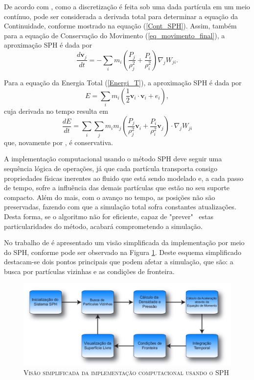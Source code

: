 De acordo com , como a discretização é feita sob uma dada partícula em um meio contínuo, pode ser considerada a derivada total para determinar a equação da Continuidade, conforme mostrado na equação (\ref{Cont_SPH}). Assim, também para a equação de Conservação do Movimento (\ref{eq_movimento_final}), a aproximação SPH é dada por
\begin{equation} \label{Mov_SPH}
\frac{d \textbf{v}_j}{dt} = -\sum\limits_{i}m_{i} \left( \frac{P_j}{\rho^{2}_{j}} + \frac{P_i}{\rho^{2}_{i}} \right) \nabla_{j}W_{ji}.
\end{equation}

Para a equação da Energia Total (\ref{Energi_T}),  a aproximação SPH é dada por
\begin{equation} \label{energ_SPH}
E = \sum\limits_{i} m_{i} \left( \frac{1}{2} \textbf{v}_{i} \cdot \textbf{v}_{i} + e_{i} \right),
\end{equation}
cuja derivada no tempo resulta em
\begin{equation}
\frac{dE}{dt} = \sum\limits_{i} \sum\limits_{j}  m_{i}  m_{j} \left( \frac{P_j}{\rho^{2}_{j}} \textbf{v}_{i} +  \frac{P_i}{\rho^{2}_{i}} \textbf{v}_{j} \right) \cdot \nabla_{j}W_{ji} 
\end{equation}
que, novamente por , é conservativa.

A implementação computacional usando o método SPH deve seguir uma sequência lógica de operações, já que cada partícula transporta consigo propriedades físicas inerentes ao fluido que está sendo modelado e, a cada passo de tempo, sofre a influência das demais partículas que estão no seu suporte compacto. Além do mais, com o avanço no tempo, as posições não são preservadas, fazendo com que a simulação total sofra constantes atualizações. Desta forma, se o algoritmo não for eficiente, capaz de "prever" \ estas particularidades do método, acabará comprometendo a simulação.

No trabalho de  é apresentado um visão simplificada da implementação por meio do SPH, conforme pode ser observado na Figura \ref{fig:visao}. Deste esquema simplificado destacam-se dois pontos principais que podem afetar a simulação, que são: a busca por partículas vizinhas e as condições de fronteira.
\begin{figure}[H]
	\centering
	\includegraphics[scale=0.9]{figuras/visao.jpg}
	\caption{\textsc{Visão simplificada da implementação computacional usando o SPH}}
	\vspace{-0.1cm}
	\label{fig:visao}
\end{figure}

